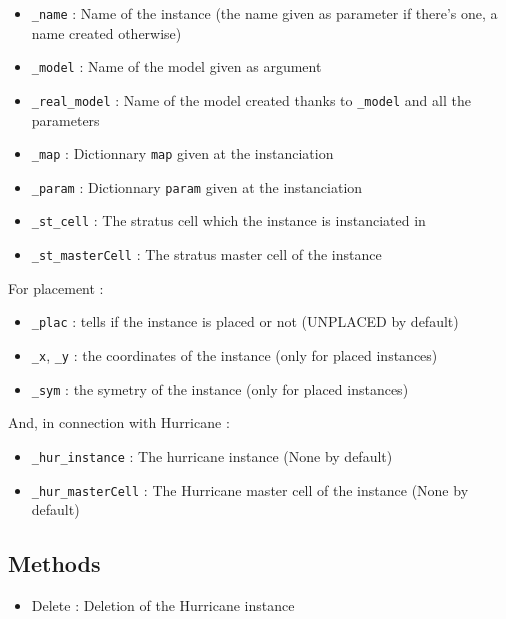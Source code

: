 \begin{itemize}
    \item \verb-_name- : Name of the instance (the name given as parameter if there's one, a name created otherwise)
    \item \verb-_model- : Name of the model given as argument
    \item \verb-_real_model- : Name of the model created thanks to \verb-_model- and all the parameters
    \item \verb-_map- : Dictionnary \verb-map- given at the instanciation
    \item \verb-_param- : Dictionnary \verb-param- given at the instanciation
    \item \verb-_st_cell- : The stratus cell which the instance is instanciated in
    \item \verb-_st_masterCell- : The stratus master cell of the instance\\
\end{itemize}
\indent For placement :
\begin{itemize}
    \item \verb-_plac- : tells if the instance is placed or not (UNPLACED by default)
    \item \verb-_x-, \verb-_y- : the coordinates of the instance (only for placed instances)
    \item \verb-_sym- : the symetry of the instance (only for placed instances)\\
\end{itemize}
\indent And, in connection with Hurricane :
\begin{itemize}
    \item \verb-_hur_instance- : The hurricane instance (None by default)
    \item \verb-_hur_masterCell- : The Hurricane master cell of the instance (None by default)
\end{itemize}

\subsection{Methods}

\begin{itemize}
    \item Delete : Deletion of the Hurricane instance
\end{itemize}
